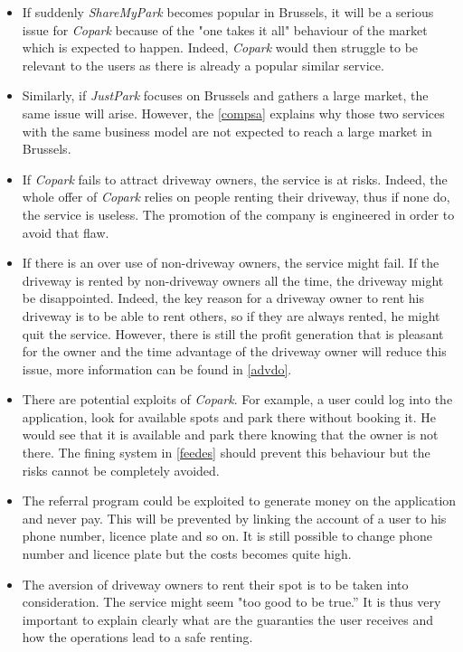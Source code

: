 \documentclass[12pt,a4paper,oneside]{book}
\newcommand{\bp}{\textit{Copark}}
\begin{document}
\begin{itemize}

\item If suddenly \textit{ShareMyPark} becomes popular in Brussels, it will be a serious issue for \bp{} because of the "one takes it all" behaviour of the market which is expected to happen. Indeed, \bp{} would then struggle to be relevant to the users as there is already a popular similar service.

\item Similarly, if \textit{JustPark} focuses on Brussels and gathers a large market, the same issue will arise. However, the \autoref{compsa} explains why those two services with the same business model are not expected to reach a large market in Brussels.

\item If \bp{}   fails to attract driveway owners, the service is at risks. Indeed, the whole offer of \bp{} relies on people renting their driveway, thus if none do, the service is useless. The promotion of the company is engineered in order to avoid that flaw.

\item If there is an over use of non-driveway owners, the service might fail. If the driveway is rented by non-driveway owners all the time, the driveway might be disappointed. Indeed, the key reason for a driveway owner to rent his driveway is to be able to rent others, so if they are always rented, he might quit the service. However, there is still the profit generation that is pleasant for the owner and the time advantage of the driveway owner will reduce this issue, more information can be found in \autoref{advdo}.

\item There are potential exploits of \bp{}. For example, a user could log into the application, look for available spots and park there without booking it. He would see that it is available and park there knowing that the owner is not there. The fining system in \autoref{feedes} should prevent this behaviour but the risks cannot be completely avoided.

\item The referral program could be exploited to generate money on the application and never pay. This will be prevented by linking the account of a user to his phone number, licence plate and so on. It is still possible to change phone number and licence plate but the costs becomes quite high.

\item The aversion of driveway owners to rent their spot is to be taken into consideration. The service might seem "too good to be true.” It is thus very important to explain clearly what are the guaranties the user receives and how the operations lead to a safe renting.


\end{itemize}
\end{document}
